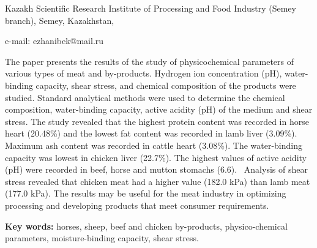 \begin{affiliation}
Kazakh Scientific Research Institute of Processing and Food Industry (Semey branch), Semey, Kazakhstan,

e-mail: ezhanibek@mail.ru
\end{affiliation}

The paper presents the results of the study of physicochemical
parameters of various types of meat and by-products. Hydrogen ion
concentration (pH), water-binding capacity, shear stress, and chemical
composition of the products were studied. Standard analytical methods
were used to determine the chemical composition, water-binding capacity,
active acidity (pH) of the medium and shear stress. The study revealed
that the highest protein content was recorded in horse heart (20.48\%)
and the lowest fat content was recorded in lamb liver (3.09\%). Maximum
ash content was recorded in cattle heart (3.08\%). The water-binding
capacity was lowest in chicken liver (22.7\%). The highest values of
active acidity (pH) were recorded in beef, horse and mutton stomachs
(6.6). ~Analysis of shear stress revealed that chicken meat had a higher
value (182.0 kPa) than lamb meat (177.0 kPa). The results may be useful
for the meat industry in optimizing processing and developing products
that meet consumer requirements.

{\bfseries Key words:} horses, sheep, beef and chicken by-products,
physico-chemical parameters, moisture-binding capacity, shear stress.

